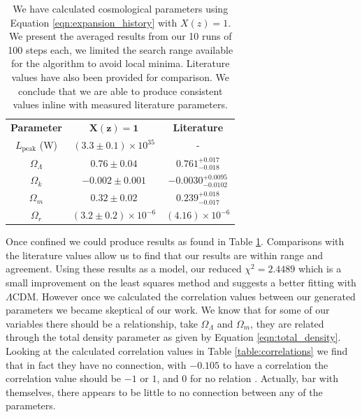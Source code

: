 \documentclass[twocolumn]{revtex4}
\begin{document}
{{\renewcommand{\arraystretch}{1.2}%
\begin{table}[h!]
\centering
\begin{tabular}{c@{\hskip 15pt}c@{\hskip 15pt}c} 
 \hline
 \textbf{Parameter} & \textbf{$\boldsymbol{X(z)=1}$} & \textbf{Literature} \\ [0.5ex] 
 $L_{\text{peak}}$ (W) & $(3.3\pm0.1)\times 10^{35}$ & - \\
 $\Omega_\Lambda$ & $0.76\pm0.04$ & $0.761^{+0.017}_{-0.018}$ \\
 $\Omega_k$ & $-0.002\pm0.001$ & $-0.0030^{+0.0095}_{-0.0102}$ \\
 $\Omega_m$ & $0.32\pm0.02$ & $0.239^{+0.018}_{-0.017}$ \\
 $\Omega_r$ & $(3.2\pm0.2)\times10^{-6}$ & $(4.16)\times10^{-6}$ \\
 \hline
\end{tabular}
\caption{We have calculated cosmological parameters using Equation \ref{eqn:expansion_history} with $X(z)=1$. We present the averaged results from our 10 runs of 100 steps each, we limited the search range available for the algorithm to avoid local minima. Literature values have also been provided for comparison. We conclude that we are able to produce consistent values inline with measured literature parameters.}
\vspace{-0.5em}
\label{table:extended_search}
\end{table}

Once confined we could produce results as found in Table \ref{table:extended_search}. Comparisons with the literature values allow us to find that our results are within range and agreement. Using these results as a model, our reduced $\chi^2=2.4489$ which is a small improvement on the least squares method and suggests a better fitting with $\Lambda$CDM. However once we calculated the correlation values between our generated parameters we became skeptical of our work. We know that for some of our variables there should be a relationship, take $\Omega_\Lambda$ and $\Omega_m$, they are related through the total density parameter as given by Equation \ref{eqn:total_density}. Looking at the calculated correlation values in Table \ref{table:correlations} we find that in fact they have no connection, with $-0.105$ to have a correlation the correlation value should be $-1$ or $1$, and $0$ for no relation \cite{hugheshase}. Actually, bar with themselves, there appears to be little to no connection between any of the parameters.

}}
\end{document}
